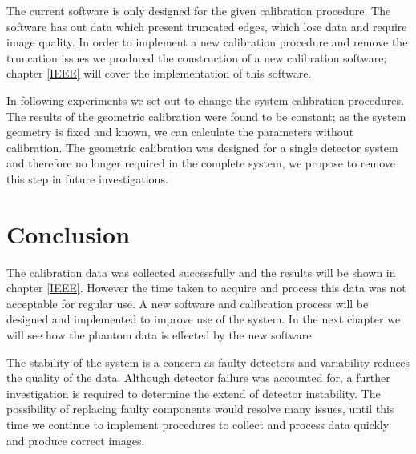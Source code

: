 The current software is only designed for the given calibration procedure. The software has out data which present truncated edges, which lose data and require image quality. In order to implement a new calibration procedure and remove the truncation issues we produced the construction of a new calibration software; chapter \ref{IEEE} will cover the implementation of this software. 

In following experiments we set out to change the system calibration procedures. The results of the geometric calibration were found to be constant; as the system geometry is fixed and known, we can calculate the parameters without calibration. The geometric calibration was designed for a single detector system and therefore no longer required in the complete system, we propose to remove this step in future investigations.

\section{Conclusion}
The calibration data was collected successfully and the results will be shown in chapter \ref{IEEE}. However the time taken to acquire and process this data was not acceptable for regular use. A new software and calibration process will be designed and implemented to improve use of the system. In the next chapter we will see how the phantom data is effected by the new software.

The stability of the system is a concern as faulty detectors and variability reduces the quality of the data. Although detector failure was accounted for, a further investigation is required to determine the extend of detector instability. The possibility of replacing faulty components would resolve many issues, until this time we continue to implement procedures to collect and process data quickly and  produce correct images.
